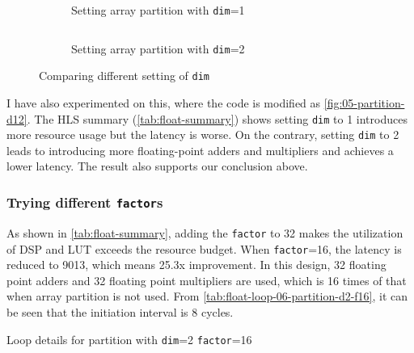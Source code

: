 \begin{figure}[ht!]
    \begin{subfigure}[b]{\textwidth}
        \inputminted[firstline=3]{diff}{program/05-partition-d1-f2.diff}
        \caption{Setting array partition with \texttt{dim}=1}
        \label{fig:05-partition-d1-f2.diff}
    \end{subfigure}
    \begin{subfigure}[b]{\textwidth}
        \inputminted[firstline=3]{diff}{program/05-partition-d2-f2.diff}
        \caption{Setting array partition with \texttt{dim}=2}
        \label{fig:05-partition-d2-f2.diff}
    \end{subfigure}
    \caption{Comparing different setting of \texttt{dim}}\label{fig:05-partition-d12}
\end{figure}

I have also experimented on this, where the code is modified as \autoref{fig:05-partition-d12}.
The HLS summary (\autoref{tab:float-summary}) shows setting \texttt{dim} to 1 introduces more resource usage but the latency is worse.
On the contrary, setting \texttt{dim} to 2 leads to introducing more floating-point adders and multipliers and achieves a lower latency.
The result also supports our conclusion above.

\subsubsection{Trying different \texttt{factor}s}\label{sec:1cFac}

As shown in \autoref{tab:float-summary}, adding the \texttt{factor} to 32 makes the utilization of DSP and LUT exceeds the resource budget.
When \texttt{factor}=16, the latency is reduced to 9013, which means 25.3x improvement.
In this design, 32 floating point adders and 32 floating point multipliers are used, which is 16 times of that when array partition is not used.
From \autoref{tab:float-loop-06-partition-d2-f16}, it can be seen that the initiation interval is 8 cycles.

\begin{table}[ht!]
    \caption{Loop details for partition with \texttt{dim}=2 \texttt{factor}=16}
    \label{tab:float-loop-06-partition-d2-f16}
    \centering
    
\end{table}
